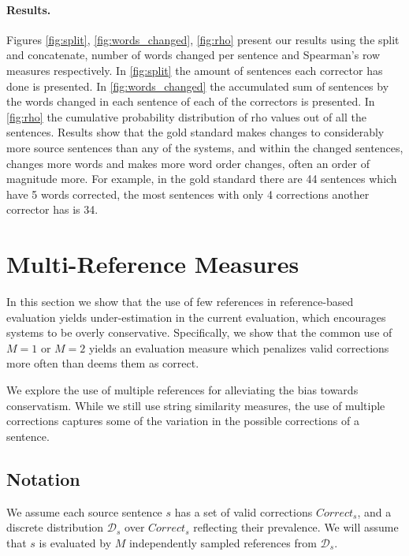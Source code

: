 \documentclass[english]{article}
\begin{document}
\paragraph{Results.}
Figures \ref{fig:split}, \ref{fig:words_changed}, \ref{fig:rho} present our results using the split and concatenate, number of words changed per sentence and Spearman's row measures respectively. In \ref{fig:split} the amount of sentences each corrector has done is presented. In \ref{fig:words_changed} the accumulated sum of sentences by the words changed in each sentence of each of the correctors is presented. In \ref{fig:rho} the cumulative probability distribution of rho values out of all the sentences.
Results show that the gold standard makes changes to considerably more source sentences than any of the systems, and within the changed sentences, changes more words and makes more word order changes, often an order of magnitude more. For example, in the gold standard there are 44 sentences which have 5 words corrected, the most sentences with only 4 corrections another corrector has is 34.

\section{Multi-Reference Measures}\label{sec:increase-reference}

In this section we show that the use of few references in reference-based evaluation yields
under-estimation in the current evaluation, which encourages systems to be overly conservative.
Specifically, we show that the common use of $M=1$ or $M=2$ yields an evaluation
measure which penalizes valid corrections more often than deems them as correct.

We explore the use of multiple references for alleviating the bias towards conservatism.
While we still use string similarity measures, the use of multiple corrections captures
some of the variation in the possible corrections of a sentence.

\subsection{Notation}

We assume each source sentence $s$ has a set of valid corrections $Correct_s$,
and a discrete distribution $\mathcal{D}_s$ over $Correct_s$ reflecting their prevalence.
We will assume that $s$ is evaluated by
$M$ independently sampled references from $\mathcal{D}_s$.
\end{document}
